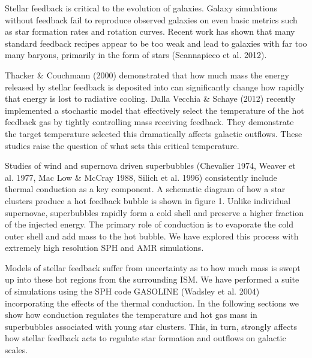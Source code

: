 \documentclass[12pt]{report}
\begin{document}
\Huge
Stellar feedback is critical to the
evolution of galaxies.  Galaxy simulations without feedback fail to
reproduce observed galaxies on even basic metrics such as star formation rates and rotation
curves.  Recent work has shown that many standard feedback recipes appear to be too weak and lead to galaxies with far too many baryons, primarily in the form of stars (Scannapieco et al. 2012). 

Thacker \& Couchmann (2000) demonstrated that how much  
mass the energy released by stellar feedback is deposited into can significantly
change how rapidly that energy is lost to radiative cooling.  Dalla Vecchia \& Schaye (2012) 
recently implemented a stochastic model that effectively select the temperature of the hot feedback gas by 
tightly controlling mass receiving feedback.  They demonstrate the target temperature selected this dramatically affects galactic outflows.  These studies raise the question of what sets this critical temperature.

Studies of wind and supernova driven superbubbles (Chevalier 1974, Weaver et al. 1977, Mac Low
\& McCray 1988, Silich et al. 1996) consistently include thermal conduction as a key component.  A
schematic diagram of how a star clusters produce a hot feedback bubble is shown in figure 1.
Unlike individual supernovae, superbubbles rapidly form a cold shell and preserve a higher fraction
of the injected energy.  The primary role of conduction is to evaporate the cold outer shell and add mass to the hot bubble.
We have explored this process with extremely high resolution SPH and AMR simulations.

Models of stellar feedback suffer from uncertainty as to how much mass
is swept up into these hot regions from the surrounding ISM.  We have
performed a suite of simulations using the SPH code GASOLINE (Wadsley
et al. 2004) incorporating the effects of the thermal conduction.  In
the following sections we show how conduction regulates the
temperature and hot gas mass in superbubbles associated with young
star clusters.  This, in turn, strongly affects how stellar feedback
acts to regulate star formation and outflows on galactic scales.
\end{document}
